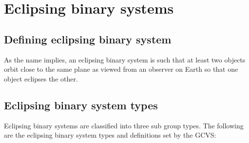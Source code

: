 \chapter{Eclipsing binary systems}

\section{Defining eclipsing binary system}
As the name implies, an eclipsing binary system is such that at least two objects orbit close to the
same plane as viewed from an observer on Earth so that one object eclipses the other.

\section{Eclipsing binary system types}
Eclipsing binary systems are classified into three sub group types.
The following are the eclipsing binary system types and definitions set by the GCVS$\colon$
